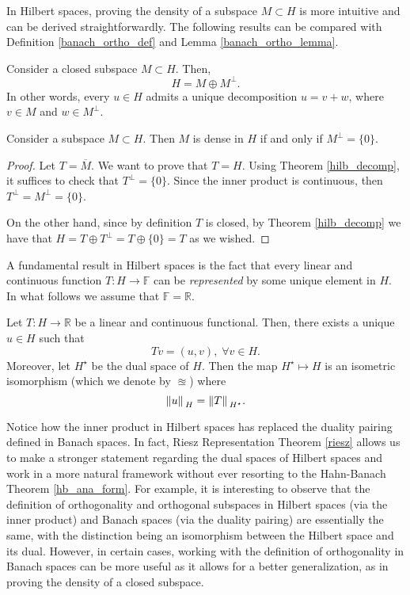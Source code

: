 In Hilbert spaces, proving the density of a subspace \(M \subset H\) is more intuitive and can be derived straightforwardly. The following results can be compared with Definition \eqref{banach_ortho_def} and Lemma \ref{banach_ortho_lemma}.

\begin{theorem}\label{hilb_decomp}
    Consider a closed subspace \(M \subset H\). Then,
    \[
    H = M \oplus M^\perp.
    \]
    In other words, every \(u \in H\) admits a unique decomposition \(u = v + w\), where \(v \in M\) and \(w \in M^\perp\).
\end{theorem}

\begin{corollary}\label{hilb_dense}
    Consider a subspace \(M \subset H\). Then \(M\) is dense in \(H\) if and only if \(M^\perp = \{0\}\).
\end{corollary}

\begin{proof}
    Let \(T = \overline{M}\). We want to prove that \(T = H\). Using Theorem \ref{hilb_decomp}, it suffices to check that \(T^\perp = \{0\}\). Since the inner product is continuous, then \(T^\perp = M^\perp = \{0\}\).
    
    On the other hand, since by definition \(T\) is closed, by Theorem \ref*{hilb_decomp} we have that \(H = T \oplus T^\perp = T \oplus \{0\} = T\) as we wished.
\end{proof}

A fundamental result in Hilbert spaces is the fact that every linear and continuous function \(T: H \rightarrow \mathbb{F}\) can be \textit{represented} by some unique element in \(H\). In what follows we assume that \(\mathbb{F} = \mathbb{R}\).
\begin{theorem}\label{riesz}
    Let \(T: H \rightarrow \mathbb{R}\) be a linear and continuous functional. Then, there exists a unique \(u \in H\) such that
    \[
        T v = (u, v), \; \forall v \in H.
    \]
    Moreover, let \(H^\star\) be the dual space of \(H\). Then the map \(H^\star \mapsto H\) is an isometric isomorphism (which we denote by \(\approxeq\)) where
    \[
        \norm*{u}_H = \norm*{T}_{H^\star}.
    \]
\end{theorem} 
\begin{remark}
    Notice how the inner product in Hilbert spaces has replaced the duality pairing defined in Banach spaces. In fact, Riesz Representation Theorem \ref{riesz} allows us to make a stronger statement regarding the dual spaces of Hilbert spaces and work in a more natural framework without ever resorting to the Hahn-Banach Theorem \ref{hb_ana_form}. For example, it is interesting to observe that the definition of orthogonality and orthogonal subspaces in Hilbert spaces (via the inner product) and Banach spaces (via the duality pairing) are essentially the same, with the distinction being an isomorphism between the Hilbert space and its dual. However, in certain cases, working with the definition of orthogonality in Banach spaces can be more useful as it allows for a better generalization, as in proving the density of a closed subspace.
\end{remark}


